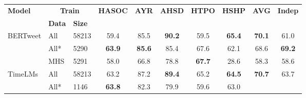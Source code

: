\begin{table}[ht]
    \vspace{0.5em}
    
    \begin{adjustbox}{width=0.95\textwidth,center}
    \begin{tabular}{lll|ccccc|c|c}
    \hline
    \multicolumn{1}{l|}{\multirow{2}{*}{\textbf{Model}}} & \multicolumn{2}{c|}{\textbf{Train}} 
        & \multirow{2}{*}{\textbf{HASOC}} & \multirow{2}{*}{\textbf{AYR}} & \multirow{2}{*}{\textbf{AHSD}} 
        & \multirow{2}{*}{\textbf{HTPO}} & \multirow{2}{*}{\textbf{HSHP}} 
        & \multirow{2}{*}{\textbf{AVG}} & \multirow{2}{*}{\textbf{Indep}} \\ \cline{2-3}
    \multicolumn{1}{l|}{}                                & \textbf{Data}       & \textbf{Size}    
        &                          &                         &                          &                          &                         
        &                          &                        \\ \hline
    \multicolumn{1}{l|}{\multirow{3}{*}{BERTweet}}    & All         & 58213           
        & 59.4                     & 85.5                    & \textbf{90.2}           & 59.5                    & \textbf{65.4} 
        & \textbf{70.1}          & 61.0                     \\
    \multicolumn{1}{l|}{}                             & All*        & 5290            
        & \textbf{63.9}            & \textbf{85.6}           & 85.4                    & 67.6                    & 62.1          
        & 68.6                   & \textbf{69.2}          \\
    \multicolumn{1}{l|}{}                             & MHS         & 5291            
        & 58.0                     & 66.8                    & 78.8                    & \textbf{67.7}           & 28.6          
        & 58.3                   & 58.6                     \\ \hline
    \multicolumn{1}{l|}{\multirow{3}{*}{TimeLMs}}     & All         & 58213           
        & 63.2                     & 87.2                    & \textbf{89.4}           & 65.2                    & \textbf{64.5} 
        & \textbf{70.7}          & 63.7                     \\
    \multicolumn{1}{l|}{}                             & All*        & 1146            
        & \textbf{63.8}            & 82.3                    & 79.9                    & 59.6                    & 63.0          

\end{tabular}
\end{adjustbox}
\end{table}
